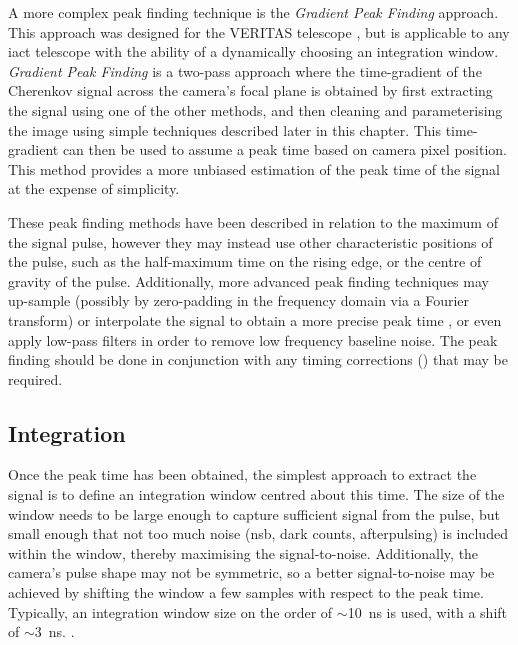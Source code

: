 A more complex peak finding technique is the \textit{Gradient Peak Finding} approach. This approach was designed for the VERITAS telescope \cite{Holder2005}\cite{Cogan2006}\cite{Cogan2007}, but is applicable to any \gls{iact} telescope with the ability of a dynamically choosing an integration window. \textit{Gradient Peak Finding} is a two-pass approach where the time-gradient of the Cherenkov signal across the camera's focal plane is obtained by first extracting the signal using one of the other methods, and then cleaning and parameterising the image using simple techniques described later in this chapter. This time-gradient can then be used to assume a peak time based on camera pixel position. This method provides a more unbiased estimation of the peak time of the signal at the expense of simplicity. 

These peak finding methods have been described in relation to the maximum of the signal pulse, however they may instead use other characteristic positions of the pulse, such as the half-maximum time on the rising edge, or the centre of gravity of the pulse. Additionally, more advanced peak finding techniques may up-sample (possibly by zero-padding in the frequency domain via a Fourier transform) or interpolate the signal to obtain a more precise peak time \cite{Cogan2006}\cite{Cogan2007}, or even apply low-pass filters in order to remove low frequency baseline noise. The peak finding should be done in conjunction with any timing corrections () that may be required.


\subsection{Integration}

Once the peak time has been obtained, the simplest approach to extract the signal is to define an integration window centred about this time. The size of the window needs to be large enough to capture sufficient signal from the pulse, but small enough that not too much noise (\gls{nsb}, dark counts, afterpulsing) is included within the window, thereby maximising the signal-to-noise. Additionally, the camera's pulse shape may not be symmetric, so a better signal-to-noise may be achieved by shifting the window a few samples with respect to the peak time. Typically, an integration window size on the order of $\sim$10~ns is used, with a shift of $\sim$3~ns.  .

